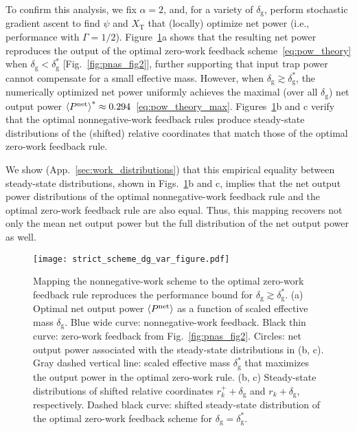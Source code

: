 \documentclass[%
reprint,
bibnotes, amsmath, amssymb, aps, pre,
 showkeys,
floatfix
]{revtex4-2}
\newcommand{\mrm}{\mathrm}
\newcommand{\dg}{\delta_{\mrm{g}}}
\newcommand{\xkr}{r_{k}}
\newcommand{\xkpr}{r_{k}^{+}}
\newcommand{\epn}{\ev{P^{\mrm{net}}}}
\newcommand{\xT}{X_{\mrm{T}}}
\begin{document}
To confirm this analysis, we fix $\alpha = 2$, and, for a variety of $\dg$, perform stochastic gradient ascent to find $\psi$ and $\xT$ that (locally) optimize net power (i.e., performance with $\Gamma = 1/2$).
Figure~\ref{fig:opt_strict_scheme_dg_var}a shows that the resulting net power reproduces the output of the optimal zero-work feedback scheme~\eqref{eq:pow_theory} when $\dg < \dg^{*}$ [Fig.~\ref{fig:pnas_fig2}], further supporting that input trap power cannot compensate for a small effective mass. 
However, when $\dg \gtrsim \dg^{*}$, the numerically optimized net power uniformly achieves the maximal (over all $\dg$) net output power 
$\epn^{*}\approx 0.294$~\eqref{eq:pow_theory_max}. 
Figures~\ref{fig:opt_strict_scheme_dg_var}b and c verify that the optimal nonnegative-work feedback rules produce steady-state distributions 
of the (shifted) relative coordinates that match those of the optimal zero-work feedback rule.

We show (App.~\ref{sec:work_distributions}) that this empirical equality between steady-state distributions, shown in Figs.~\ref{fig:opt_strict_scheme_dg_var}b and c, implies that the net output power distributions of the optimal nonnegative-work feedback rule and the optimal zero-work feedback rule are also equal. Thus, this mapping recovers not only the mean net output power but the full distribution of the net output power as well.

\begin{figure}[htbp]
    \centering
    \texttt{[image: strict\_scheme\_dg\_var\_figure.pdf]}
    \caption{
        Mapping the nonnegative-work scheme to the optimal zero-work feedback rule reproduces the performance bound for $\dg \gtrsim \dg^{*}$.
        (a) Optimal net output power $\epn$ as a function of scaled effective mass $\dg$. 
        Blue wide curve: nonnegative-work feedback. 
        Black thin curve: zero-work feedback from Fig.~\ref{fig:pnas_fig2}.
        Circles: net output power associated with the steady-state distributions in (b, c).
        Gray dashed vertical line: scaled effective mass $\dg^{*}$ that maximizes the output power in the optimal zero-work rule.
        (b, c) Steady-state distributions of shifted relative coordinates $\xkpr + \dg$ and $\xkr + \dg$, respectively. 
        Dashed black curve: shifted steady-state distribution of the optimal zero-work feedback scheme for $\dg=\dg^{*}$.
        }
    \label{fig:opt_strict_scheme_dg_var}
\end{figure}
\end{document}

